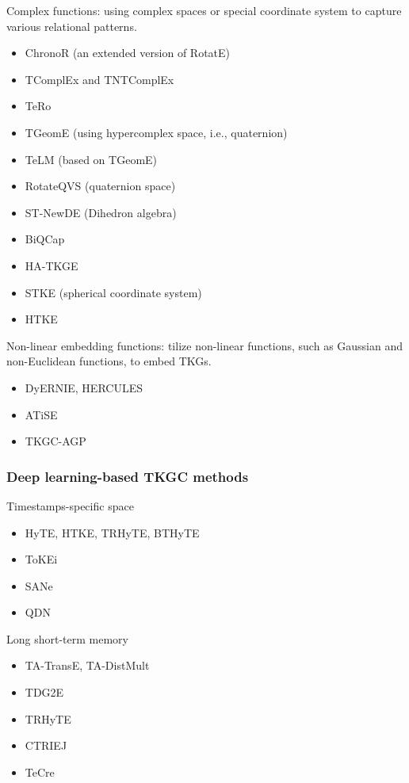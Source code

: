 \documentclass[12pt]{article}
\begin{document}
Complex functions: using complex spaces or special coordinate system to capture
various relational patterns.
\begin{itemize}
    \item ChronoR (an extended version of RotatE)
    \item TComplEx and TNTComplEx 
    \item TeRo 
    \item TGeomE (using hypercomplex space, i.e., quaternion)
    \item TeLM (based on TGeomE)
    \item RotateQVS (quaternion space)
    \item ST-NewDE (Dihedron algebra)
    \item BiQCap
    \item HA-TKGE
    \item STKE (spherical coordinate system)
    \item HTKE
\end{itemize}

Non-linear embedding functions: tilize non-linear functions, such as Gaussian and
non-Euclidean functions, to embed TKGs.
\begin{itemize}
    \item DyERNIE, HERCULES
    \item ATiSE
    \item TKGC-AGP
\end{itemize}

\subsubsection{Deep learning-based TKGC methods}

Timestamps-specific space 
\begin{itemize}
    \item HyTE, HTKE, TRHyTE, BTHyTE
    \item ToKEi
    \item SANe
    \item QDN
\end{itemize}

Long short-term memory
\begin{itemize}
    \item TA-TransE, TA-DistMult
    \item TDG2E
    \item TRHyTE
    \item CTRIEJ
    \item TeCre
\end{itemize}
\end{document}
